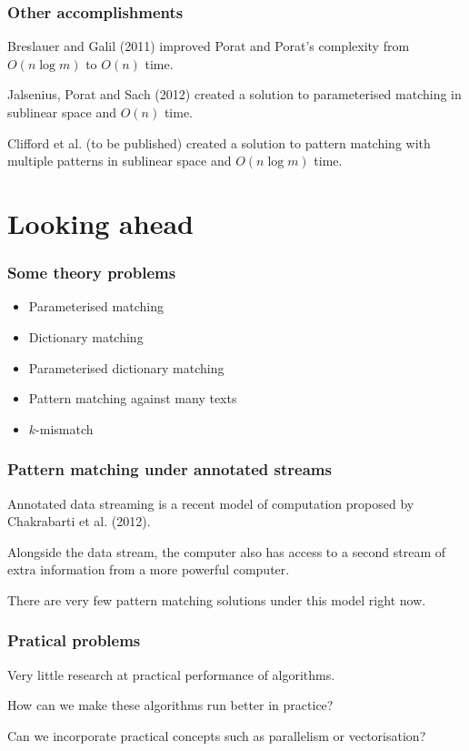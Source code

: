 \documentclass{beamer}
\begin{document}

\begin{frame}
\frametitle{Other accomplishments}
Breslauer and Galil (2011) improved Porat and Porat's complexity from $O(n\log m)$ to $O(n)$ time.

Jalsenius, Porat and Sach (2012) created a solution to parameterised matching in sublinear space and $O(n)$ time.

Clifford et al. (to be published) created a solution to pattern matching with multiple patterns in sublinear space and $O(n\log m)$ time.
\end{frame}

\section{Looking ahead}

\begin{frame}
\frametitle{Some theory problems}
\begin{itemize}
    \item Parameterised matching
    \item Dictionary matching
    \item Parameterised dictionary matching
    \item Pattern matching against many texts
    \item $k$-mismatch
\end{itemize}
\end{frame}


\begin{frame}
\frametitle{Pattern matching under annotated streams}
Annotated data streaming is a recent model of computation proposed by Chakrabarti et al. (2012).

Alongside the data stream, the computer also has access to a second stream of extra information from a more powerful computer.

There are very few pattern matching solutions under this model right now.
\end{frame}


\begin{frame}
\frametitle{Pratical problems}
Very little research at practical performance of algorithms.

How can we make these algorithms run better in practice?

Can we incorporate practical concepts such as parallelism or vectorisation?
\end{frame}
\end{document}
